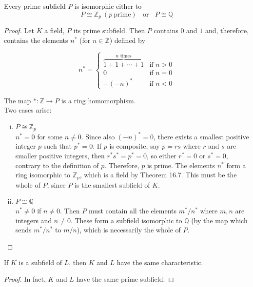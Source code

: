 \documentclass{article}
\theoremstyle{definition}
\newenvironment{thm}[1]
{\renewcommand\theinnerthm{#1}\innerthm}
{\endinnerthm}
\newenvironment{lemma}[1]
{\renewcommand\theinnerlemma{#1}\innerlemma}
{\endinnerlemma}
\begin{document}
\begin{thm}{16.10}
  Every prime subfield $P$ is isomorphic either to
  $$P \cong \mathbb{Z}_p~ (p~ \text{prime})~~~~\text{or}~~~~ P \cong \mathbb{Q}$$
\end{thm}
\begin{proof}
Let $K$ a field, $P$ its prime subfield. Then $P$ contains $0$ and $1$ and, 
therefore, contains the elements $n^*$ (for $n \in \mathbb{Z}$) defined by

$$n^* =
\begin{cases}
\overbrace{1 + 1 + \cdots + 1}^{n \text{ times}} & \text{if } n > 0\\
0 & \text{if } n = 0\\
-(-n)^* & \text{if } n < 0
\end{cases}$$

The map $* : \mathbb{Z} \to P$ is a ring homomorphism.\\
Two cases arise:
\begin{enumerate}[i.]
  \item $P \cong \mathbb{Z}_p$\\
  $n^* = 0$ for some $n \neq 0$. Since also $(-n)^* = 0$, there exists a smallest 
  positive integer $p$ such that $p^* = 0$. If $p$ is composite, say $p = rs$ where $r$ and $s$ are 
  smaller positive integers, then $r^* s^* = p^* = 0$, so either $r^* = 0$ or $s^* = 0$, contrary 
  to the definition of $p$. Therefore, $p$ is prime. The elements $n^*$ form a ring isomorphic 
  to $\mathbb{Z}_p$, which is a field by Theorem 16.7. This must be the whole of $P$, since $P$ is the 
  smallest subfield of $K$.

  \item $P \cong \mathbb{Q}$\\
  $n^* \neq 0$ if $n \neq 0$. Then $P$ must contain all the elements $m^*/n^*$ where $m, n$ are integers and $n \neq 0$. These form a subfield isomorphic to $\mathbb{Q}$ (by the map which sends $m^*/n^*$ to $m/n$), which is necessarily the whole of $P$.
\end{enumerate}
\end{proof}


\begin{lemma}{16.11}
  If $K$ is a subfield of $L$, then $K$ and $L$ have the same characteristic. 
\end{lemma}
\begin{proof}
  In fact, $K$ and $L$ have the same prime subfield.
\end{proof}

\vspace{1.0cm}
\end{document}
